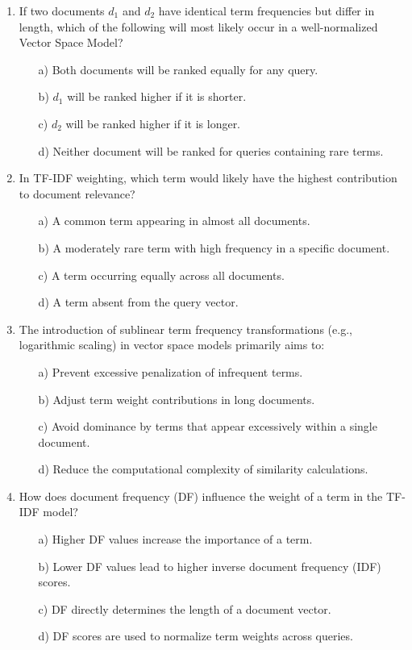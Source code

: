 \documentclass[8pt]{extarticle}
\begin{document}
\begin{multicols}{2}
\begin{enumerate}
\item If two documents \(d_1\) and \(d_2\) have identical term frequencies but differ in length, which of the following will most likely occur in a well-normalized Vector Space Model?
\begin{itemize}
    \item[a)] Both documents will be ranked equally for any query.
    \item[b)] \(d_1\) will be ranked higher if it is shorter.
    \item[c)] \(d_2\) will be ranked higher if it is longer.
    \item[d)] Neither document will be ranked for queries containing rare terms.
\end{itemize}

\item In TF-IDF weighting, which term would likely have the highest contribution to document relevance?
\begin{itemize}
    \item[a)] A common term appearing in almost all documents.
    \item[b)] A moderately rare term with high frequency in a specific document.
    \item[c)] A term occurring equally across all documents.
    \item[d)] A term absent from the query vector.
\end{itemize}

\item The introduction of sublinear term frequency transformations (e.g., logarithmic scaling) in vector space models primarily aims to:
\begin{itemize}
    \item[a)] Prevent excessive penalization of infrequent terms.
    \item[b)] Adjust term weight contributions in long documents.
    \item[c)] Avoid dominance by terms that appear excessively within a single document.
    \item[d)] Reduce the computational complexity of similarity calculations.
\end{itemize}

\item How does document frequency (DF) influence the weight of a term in the TF-IDF model?
\begin{itemize}
    \item[a)] Higher DF values increase the importance of a term.
    \item[b)] Lower DF values lead to higher inverse document frequency (IDF) scores.
    \item[c)] DF directly determines the length of a document vector.
    \item[d)] DF scores are used to normalize term weights across queries.
\end{itemize}


\end{enumerate}
\end{multicols}
\end{document}
